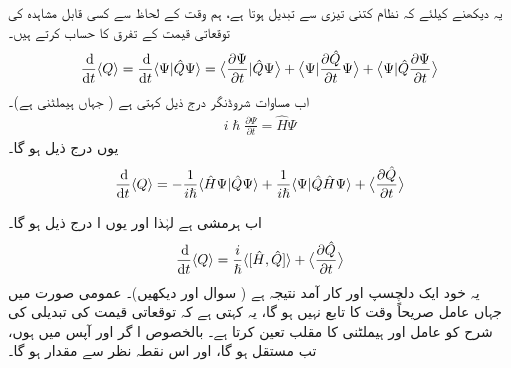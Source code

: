  یہ دیکھنے کیلئے کہ نظام کتنی تیزی سے تبدیل ہوتا ہے،   ہم  وقت کے لحاظ سے کسی قابل مشاہدہ  کی توقعاتی قیمت  کے  تفرق کا حساب  کرتے ہیں۔ 
\begin{align*}
\frac{\dif}{\dif t} \langle Q \rangle = \frac{\dif}{\dif t} \langle \Psi | \hat{Q} \Psi \rangle = \big\langle \frac{\partial\Psi}{\partial t} \vert \hat{Q} \Psi \big\rangle + \big\langle \Psi \vert \frac{\partial \hat{Q}}{\partial t} \Psi \big\rangle + \big\langle \Psi \vert \hat{Q} \frac{\partial \Psi}{\partial t} \big\rangle 
\end{align*}
اب مساوات  شروڈنگر   درج ذیل کہتی ہے (  جہاں  ہیملٹنی ہے)۔ 
\begin{align*}
i \hslash \frac{\partial \Psi}{\partial t} = \hat{H} \Psi
\end{align*}
یوں درج ذیل ہو گا۔ 
\begin{align*}
\frac{\dif}{\dif t}\langle Q\rangle =-\frac{1}{i \hslash} \langle \hat{H}\Psi | \hat{Q} \Psi\rangle+\frac{1}{i\hslash}\langle \Psi |\hat{Q} \hat{H} \Psi\rangle +\big \langle \frac{\partial \hat{Q}}{\partial t}\big \rangle
\end{align*}

اب  ہرمشی ہے لہٰذا   اور یوں ا درج ذیل ہو گا۔
\begin{align}\label{مساوات_قواعد_شرح_تبدیلی_قابل_مشاہدہ}
\frac{\dif}{\dif t} \langle Q \rangle = \frac{i}{\hslash} \langle [ \hat{H} , \hat{Q} ] \rangle + \big\langle \frac{\partial \hat{Q}}{\partial t} \big\rangle 
\end{align}
یہ  خود  ایک دلچسپ اور کار آمد نتیجہ ہے ( سوال    اور   دیکھیں)۔  عمومی   صورت میں جہاں  عامل صریحاً وقت کا تابع نہیں  ہو گا،   یہ کہتی ہے کہ توقعاتی قیمت  کی تبدیلی کی شرح کو    عامل اور ہیملٹنی کا مقلب تعین کرتا ہے۔ بالخصوص  ا  گر  اور   آپس میں  ہوں، تب  مستقل ہو گا،  اور اس نقطہ نظر سے   مقدار ہو گا۔

